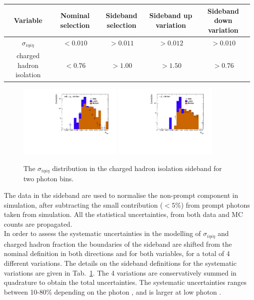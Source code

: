 \begin{table}[h!]
  \label{tab:phoPurity-sideband}
  \centering
  \footnotesize
  \begin{tabular}{ ccccc }
    \hline
    \hline
    Variable & Nominal selection & Sideband selection & Sideband up variation & Sideband down variation \\
    \hline
    $\sigma_{i\eta i\eta}$   & $<0.010$ & $>0.011$ & $>0.012$ & $>0.010$ \\
    charged hadron isolation & $<0.76$  & $>1.00$  & $>1.50$  & $>0.76$  \\ 
    \hline
    \hline
  \end{tabular}
\end{table}

\begin{figure}[h!]
  \centering
  \includegraphics[width=0.45\textwidth]{figures/photonpurity/sigmaIetaIeta_chHadIsoSB_all_gammaPt_200_250_nominal} 
  \includegraphics[width=0.45\textwidth]{figures/photonpurity/sigmaIetaIeta_chHadIsoSB_all_gammaPt_700_999999_nominal} 
  \caption{\label{fig:chHadIsoSideband} 
  The $\sigma_{i\eta i\eta}$ distribution in the charged hadron isolation sideband for two photon \pt bins. }
\end{figure}

The data in the sideband are used to normalise the non-prompt component in simulation, 
after subtracting the small contribution ($<5$\%) from prompt photons taken from simulation. 
All the statistical uncertainties, from both data and MC counts are propagated. \\
In order to assess the systematic uncertainties in the modelling of $\sigma_{i\eta i\eta}$ 
and charged hadron fraction the boundaries of the sideband are shifted from the 
nominal definition in both directions and for both variables, for a total of 4 different variations. 
The details on the sideband definitions for the systematic variations are given in Tab.~\ref{tab:phoPurity-sideband}. 
The 4 variations are conservatively summed in quadrature to obtain the total uncertainties. 
The systematic uncertainties ranges between 10-80\% depending on the photon \pt, 
and is larger at low photon \pt.

